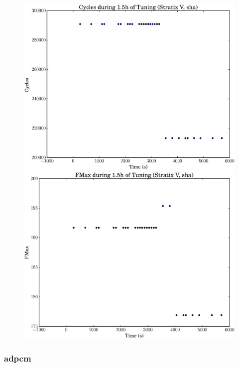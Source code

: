 \documentclass[12pt, a4paper]{article}
\begin{document}
\begin{figure}[htpb]
    \begin{minipage}{.48\textwidth}
        \includegraphics[scale=.25]{sha_cycles_5400_chstone_StratixV}
    \end{minipage}%
    \hfill
    \begin{minipage}{.48\textwidth}
        \includegraphics[scale=.25]{sha_fmax_5400_chstone_StratixV}
    \end{minipage}%
\end{figure}

\newpage

\subsubsection{adpcm}
\end{document}
